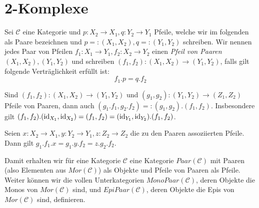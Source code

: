 \section{2-Komplexe}


\begin{defn}
Sei $\mathcal C$ eine Kategorie und $p : X_2 \to X_1, q: Y_2 \to Y_1$ Pfeile, welche wir im folgenden als Paare bezeichnen und $p =: (X_1,X_2), q =: (Y_1,Y_2)$ schreiben.
Wir nennen jedes Paar von Pfeilen $f_1 : X_1 \to Y_1, f_2 : X_2 \to Y_2$ einen \emph{Pfeil von Paaren $(X_1,X_2),(Y_1,Y_2)$} und schreiben $(f_1,f_2) : (X_1,X_2) \to (Y_1,Y_2)$, falls gilt folgende Verträglichkeit erfüllt ist:
\[ f_1 . p = q . f_2 \]
\end{defn}

\begin{prop}
Sind $(f_1,f_2) : (X_1,X_2) \to (Y_1,Y_2)$ und $(g_1,g_2) : (Y_1,Y_2) \to (Z_1,Z_2)$ Pfeile von Paaren, dann auch $(g_1.f_1, g_2.f_2) =: (g_1,g_2).(f_1,f_2)$.
Insbesondere gilt $(f_1,f_2).(\operatorname{id}_{X_1},\operatorname{id}_{X_2}) = (f_1,f_2) = (\operatorname{id}_{Y_1},\operatorname{id}_{Y_2}).(f_1,f_2) $.
\end{prop}
\begin{bew}
Seien $x : X_2 \to X_1, y:Y_2 \to Y_1, z : Z_2 \to Z_2$ die zu den Paaren assoziierten Pfeile.
Dann gilt $g_1.f_1 . x = g_1.y.f_2 = z.g_2.f_2$.
\end{bew}

\begin{bem}
Damit erhalten wir für eine Kategorie $\mathcal C$ eine Kategorie $Paar(\mathcal C)$ mit Paaren (also Elementen aus $Mor(\mathcal C)$) als Objekte und Pfeile von Paaren als Pfeile.
Weiter können wir die vollen Unterkategorien $MonoPaar(\mathcal C)$, deren Objekte die Monos von $Mor(\mathcal C)$ sind, und $EpiPaar(\mathcal C)$, deren Objekte die Epis von $Mor(\mathcal C)$ sind, definieren.
\end{bem}

